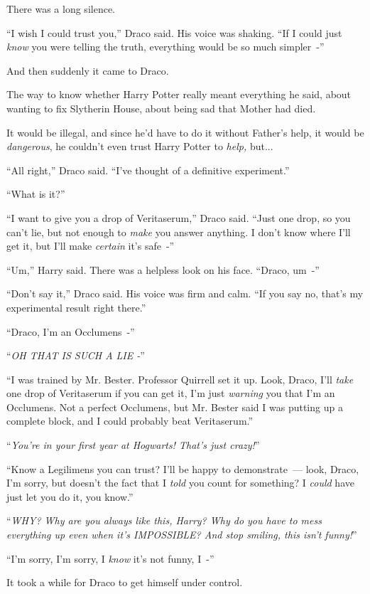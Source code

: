 There was a long silence.

``I wish I could trust you,'' Draco said. His voice was shaking. ``If I could just \emph{know} you were telling the truth, everything would be so much simpler~-''

And then suddenly it came to Draco.

The way to know whether Harry Potter really meant everything he said, about wanting to fix Slytherin House, about being sad that Mother had died.

It would be illegal, and since he'd have to do it without Father's help, it would be \emph{dangerous}, he couldn't even trust Harry Potter to \emph{help,} but...

``All right,'' Draco said. ``I've thought of a definitive experiment.''

``What is it?''

``I want to give you a drop of Veritaserum,'' Draco said. ``Just one drop, so you can't lie, but not enough to \emph{make} you answer anything. I don't know where I'll get it, but I'll make \emph{certain} it's safe~-''

``Um,'' Harry said. There was a helpless look on his face. ``Draco, um~-''

``Don't say it,'' Draco said. His voice was firm and calm. ``If you say no, that's my experimental result right there.''

``Draco, I'm an Occlumens~-''

``\emph{OH THAT IS SUCH A LIE -}''

``I was trained by Mr. Bester. Professor Quirrell set it up. Look, Draco, I'll \emph{take} one drop of Veritaserum if you can get it, I'm just \emph{warning} you that I'm an Occlumens. Not a perfect Occlumens, but Mr. Bester said I was putting up a complete block, and I could probably beat Veritaserum.''

``\emph{You're in your first year at Hogwarts! That's just crazy!}''

``Know a Legilimens you can trust? I'll be happy to demonstrate~--- look, Draco, I'm sorry, but doesn't the fact that I \emph{told} you count for something? I \emph{could} have just let you do it, you know.''

``\emph{WHY? Why are you always like this, Harry? Why do you have to mess everything up even when it's IMPOSSIBLE? And stop smiling, this isn't funny!}''

``I'm sorry, I'm sorry, I \emph{know} it's not funny, I~-''

It took a while for Draco to get himself under control.

